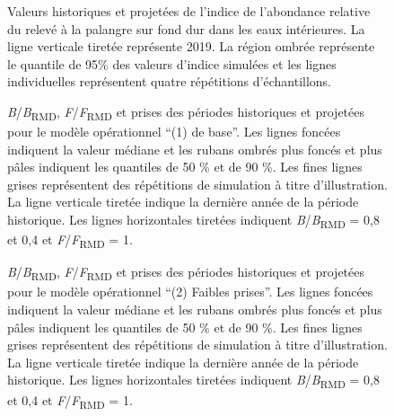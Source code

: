 \documentclass[11pt]{book}
\begin{document}
\clearpage
\begin{figure}[htb]

{\centering {} 

}

\caption{Valeurs historiques et projetées de l’indice de l’abondance relative du relevé à la palangre sur fond dur dans les eaux intérieures. La ligne verticale tiretée représente 2019. La région ombrée représente le quantile de 95\% des valeurs d’indice simulées et les lignes individuelles représentent quatre répétitions d’échantillons.}\label{fig:proj-index}
\end{figure}
\clearpage


\begin{figure}[htb]

{\centering {} 

}

\caption{\emph{B}/\emph{B}\textsubscript{RMD}, \emph{F}/\emph{F}\textsubscript{RMD} et prises des périodes historiques et projetées pour le modèle opérationnel ``(1) de base''. Les lignes foncées indiquent la valeur médiane et les rubans ombrés plus foncés et plus pâles indiquent les quantiles de 50 \% et de 90 \%. Les fines lignes grises représentent des répétitions de simulation à titre d'illustration. La ligne verticale tiretée indique la dernière année de la période historique. Les lignes horizontales tiretées indiquent \emph{B}/\emph{B}\textsubscript{RMD} = 0,8 et 0,4 et \emph{F}/\emph{F}\textsubscript{RMD} = 1.}\label{fig:proj-updog-fixsel}
\end{figure}

\begin{figure}[htb]

{\centering {} 

}

\caption{\emph{B}/\emph{B}\textsubscript{RMD}, \emph{F}/\emph{F}\textsubscript{RMD} et prises des périodes historiques et projetées pour le modèle opérationnel ``(2) Faibles prises''. Les lignes foncées indiquent la valeur médiane et les rubans ombrés plus foncés et plus pâles indiquent les quantiles de 50 \% et de 90 \%. Les fines lignes grises représentent des répétitions de simulation à titre d'illustration. La ligne verticale tiretée indique la dernière année de la période historique. Les lignes horizontales tiretées indiquent \emph{B}/\emph{B}\textsubscript{RMD} = 0,8 et 0,4 et \emph{F}/\emph{F}\textsubscript{RMD} = 1.}\label{fig:proj-low-catch}
\end{figure}
\end{document}
